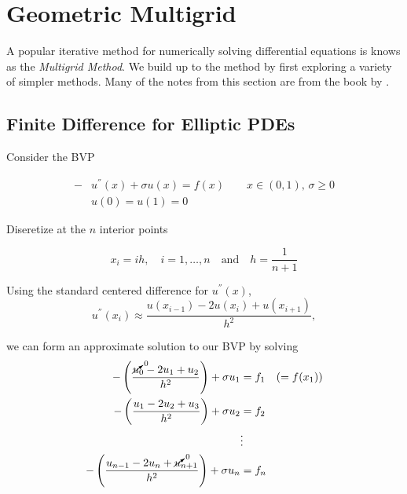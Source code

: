 \section{Geometric Multigrid}

A popular iterative method for numerically solving differential equations
is knows as the \emph{Multigrid Method}. We build up to the method by first
exploring a variety of simpler methods. Many of the notes from this section are
from the book by \cite{briggs-2000}. 

\subsection{Finite Difference for Elliptic PDEs}

Consider the BVP

\begin{align*}
-&u^{''}(x) + \sigma u(x) = f(x) \qquad x\in (0,1),\, \sigma \geq 0 \\
 &u(0)=u(1)=0
\end{align*}

Diseretize at the $n$ interior points

\begin{equation*}
x_i = ih, \quad i=1, \ldots, n \quad \text{and} \quad h = \frac{1}{n+1}
\end{equation*}

Using the standard centered difference for $u^{''}(x)$,
\begin{equation*}
u^{''}(x_i) \approx \frac{u(x_{i-1}) - 2 u(x_i) + u(x_{i+1})}{h^2},
\end{equation*}

we can form an approximate solution to our BVP by solving
\begin{align*}
  -\left( \frac{\cancelto{0}{u}_0-2u_1+u_2}{h^2} \right) + \sigma u_1           &= f_1 \quad (=f(x_1)) \\
  -\left( \frac{u_1-2u_2+u_3}{h^2} \right) + \sigma u_2                         &= f_2 \\
                                                                               &\vdots\\
  -\left( \frac{u_{n-1}-2u_n + \cancelto{0}{u}_{n+1}}{h^2} \right) + \sigma u_n  &= f_n \\
\end{align*}

